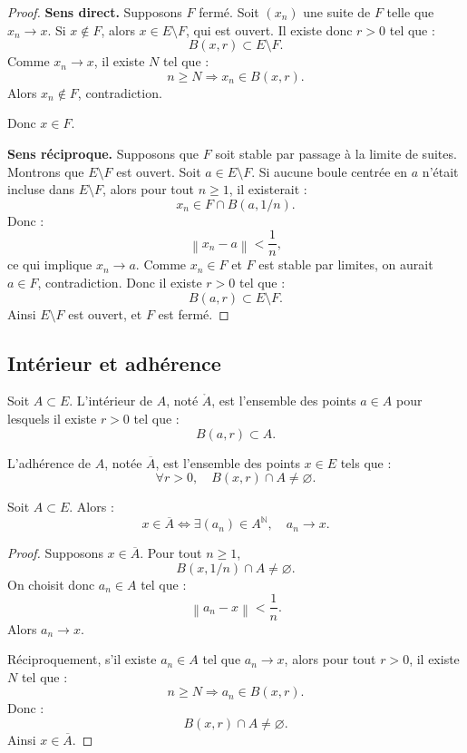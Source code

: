 \documentclass[11pt,a4paper]{article}
\newcommand{\N}{\mathbb N}
\newcommand{\norme}[1]{\left\lVert #1 \right\rVert}
\begin{document}
\begin{proof}
\textbf{Sens direct.}  
Supposons \(F\) fermé. Soit \((x_n)\) une suite de \(F\) telle que \(x_n\to x\).  
Si \(x\notin F\), alors \(x\in E\setminus F\), qui est ouvert.  
Il existe donc \(r>0\) tel que :
\[
B(x,r)\subset E\setminus F.
\]
Comme \(x_n\to x\), il existe \(N\) tel que :
\[
n\geq N\Rightarrow x_n\in B(x,r).
\]
Alors \(x_n\notin F\), contradiction.

Donc \(x\in F\).

\textbf{Sens réciproque.}  
Supposons que \(F\) soit stable par passage à la limite de suites. Montrons que \(E\setminus F\) est ouvert.  
Soit \(a\in E\setminus F\). Si aucune boule centrée en \(a\) n'était incluse dans \(E\setminus F\), alors pour tout \(n\geq1\), il existerait :
\[
x_n\in F\cap B(a,1/n).
\]
Donc :
\[
\norme{x_n-a}<\frac1n,
\]
ce qui implique \(x_n\to a\).  
Comme \(x_n\in F\) et \(F\) est stable par limites, on aurait \(a\in F\), contradiction.  
Donc il existe \(r>0\) tel que :
\[
B(a,r)\subset E\setminus F.
\]
Ainsi \(E\setminus F\) est ouvert, et \(F\) est fermé.
\end{proof}

\subsection{Intérieur et adhérence}

\begin{definitionbox}[Intérieur]
Soit \(A\subset E\).  
L'intérieur de \(A\), noté \(\mathring A\), est l'ensemble des points \(a\in A\) pour lesquels il existe \(r>0\) tel que :
\[
B(a,r)\subset A.
\]
\end{definitionbox}

\begin{definitionbox}[Adhérence]
L'adhérence de \(A\), notée \(\overline A\), est l'ensemble des points \(x\in E\) tels que :
\[
\forall r>0,\quad B(x,r)\cap A\neq\varnothing.
\]
\end{definitionbox}

\begin{theorembox}
Soit \(A\subset E\).  
Alors :
\[
x\in\overline A
\Longleftrightarrow
\exists (a_n)\in A^\N,\quad a_n\to x.
\]
\end{theorembox}

\begin{proof}
Supposons \(x\in\overline A\).  
Pour tout \(n\geq1\),
\[
B(x,1/n)\cap A\neq\varnothing.
\]
On choisit donc \(a_n\in A\) tel que :
\[
\norme{a_n-x}<\frac1n.
\]
Alors \(a_n\to x\).

Réciproquement, s'il existe \(a_n\in A\) tel que \(a_n\to x\), alors pour tout \(r>0\), il existe \(N\) tel que :
\[
n\geq N\Rightarrow a_n\in B(x,r).
\]
Donc :
\[
B(x,r)\cap A\neq\varnothing.
\]
Ainsi \(x\in\overline A\).
\end{proof}
\end{document}
